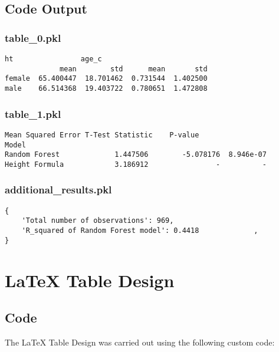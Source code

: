 \documentclass[11pt]{article}
\begin{document}
\subsection{Code Output}

\subsubsection*{table\_0.pkl}

\begin{Verbatim}[tabsize=4]
               ht                age_c
             mean        std      mean       std
female  65.400447  18.701462  0.731544  1.402500
male    66.514368  19.403722  0.780651  1.472808
\end{Verbatim}

\subsubsection*{table\_1.pkl}

\begin{Verbatim}[tabsize=4]
                Mean Squared Error T-Test Statistic    P-value
Model
Random Forest             1.447506        -5.078176  8.946e-07
Height Formula            3.186912                -          -
\end{Verbatim}

\subsubsection*{additional\_results.pkl}

\begin{Verbatim}[tabsize=4]
{
    'Total number of observations': 969,
    'R_squared of Random Forest model': 0.4418             ,
}
\end{Verbatim}

\section{LaTeX Table Design}
\subsection{{Code}}
The LaTeX Table Design was carried out using the following custom code:
\end{document}
